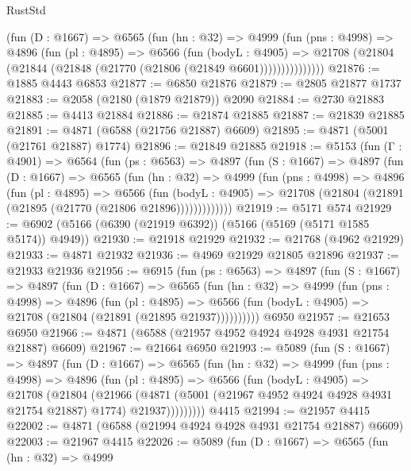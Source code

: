 \begin{lexlean}{RustStd}
\begin{coremodule}
            (fun (D : @1667) =>
            @6565
              (fun (hn : @32) =>
              @4999
                (fun (pns : @4998) =>
                @4896
                  (fun (pl : @4895) =>
                  @6566
                    (fun (bodyL : @4905) =>
                    @21708 (@21804 (@21844 (@21848 (@21770 (@21806 (@21849 @6601)))))))))))))))
@21876 := @1885 @4443 @6853
@21877 := @6850 @21876
@21879 := @2805 @21877 @1737
@21883 := @2058 (@2180 (@1879 @21879)) @2090
@21884 := @2730 @21883
@21885 := @4413 @21884
@21886 := @21874 @21885
@21887 := @21839 @21885
@21891 := @4871 (@6588 (@21756 @21887) @6609)
@21895 := @4871 (@5001 (@21761 @21887) @1774)
@21896 := @21849 @21885
@21918 := @5153
    (fun (Γ : @4901) =>
    @6564
      (fun (ps : @6563) =>
      @4897
        (fun (S : @1667) =>
        @4897
          (fun (D : @1667) =>
          @6565
            (fun (hn : @32) =>
            @4999
              (fun (pns : @4998) =>
              @4896
                (fun (pl : @4895) =>
                @6566
                  (fun (bodyL : @4905) =>
                  @21708 (@21804 (@21891 (@21895 (@21770 (@21806 @21896)))))))))))))
@21919 := @5171 @574
@21929 := @6902 (@5166 (@6390 (@21919 @6392)) (@5166 (@5169 (@5171 @1585 @5174)) @4949))
@21930 := @21918 @21929
@21932 := @21768 (@4962 @21929)
@21933 := @4871 @21932
@21936 := @4969 @21929 @21805 @21896
@21937 := @21933 @21936
@21956 := @6915
    (fun (ps : @6563) =>
    @4897
      (fun (S : @1667) =>
      @4897
        (fun (D : @1667) =>
        @6565
          (fun (hn : @32) =>
          @4999
            (fun (pns : @4998) =>
            @4896
              (fun (pl : @4895) =>
              @6566 (fun (bodyL : @4905) => @21708 (@21804 (@21891 (@21895 @21937))))))))))
    @6950
@21957 := @21653 @6950
@21966 := @4871 (@6588 (@21957 @4952 @4924 @4928 @4931 @21754 @21887) @6609)
@21967 := @21664 @6950
@21993 := @5089
    (fun (S : @1667) =>
    @4897
      (fun (D : @1667) =>
      @6565
        (fun (hn : @32) =>
        @4999
          (fun (pns : @4998) =>
          @4896
            (fun (pl : @4895) =>
            @6566
              (fun (bodyL : @4905) =>
              @21708
                (@21804
                  (@21966
                    (@4871
                      (@5001 (@21967 @4952 @4924 @4928 @4931 @21754 @21887) @1774)
                      @21937)))))))))
    @4415
@21994 := @21957 @4415
@22002 := @4871 (@6588 (@21994 @4924 @4928 @4931 @21754 @21887) @6609)
@22003 := @21967 @4415
@22026 := @5089
    (fun (D : @1667) =>
    @6565
      (fun (hn : @32) =>
      @4999

\end{coremodule}
\end{lexlean}
